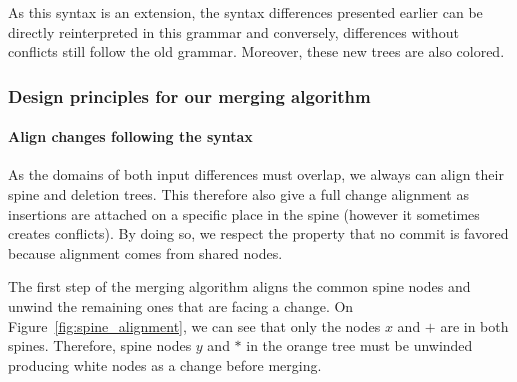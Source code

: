\documentclass[a4paper,11pt]{article}
\newcommand\gb[1]{}%
\begin{document}
As this syntax is an extension, the syntax differences presented earlier can be directly reinterpreted in this grammar and conversely, differences without conflicts still follow the old grammar. Moreover, these new trees are also colored. \gb{Should I color the grammar?}

\subsubsection{Design principles for our merging algorithm}
\label{sec:merge_principles}
\paragraph{Align changes following the syntax}
As the domains of both input differences must overlap, we always can align their spine and deletion trees. This therefore also give a full change alignment as insertions are attached on a specific place in the spine (however it sometimes creates conflicts). By doing so, we respect the property that no commit is favored because alignment comes from shared nodes.

The first step of the merging algorithm aligns the common spine nodes and unwind the remaining ones that are facing a change. On Figure~\ref{fig:spine_alignment}, we can see that only the nodes $x$ and $+$ are in both spines. Therefore, spine nodes $y$ and $*$ in the orange tree must be unwinded producing white nodes as a change before merging.
\end{document}
